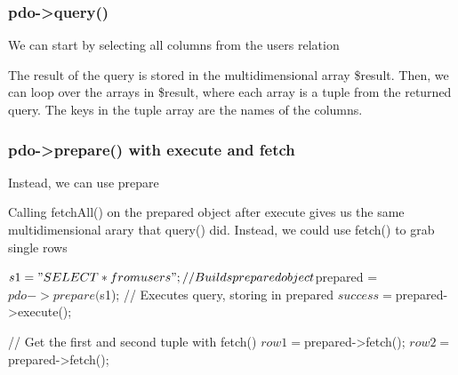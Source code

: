 \documentclass{report}
\begin{document}
    \bigbreak \noindent 
    \subsubsection{pdo->query()}
    \bigbreak \noindent 
    We can start by selecting all columns from the users relation
    \bigbreak \noindent 
    \bigbreak \noindent 
    The result of the query is stored in the multidimensional array \$result. Then, we can loop over the arrays in \$result, where each array is a tuple from the returned query. The keys in the tuple array are the names of the columns.

    \bigbreak \noindent 
    \subsubsection{pdo->prepare() with execute and fetch}
    \bigbreak \noindent 
    Instead, we can use prepare
    \bigbreak \noindent 
    \bigbreak \noindent 
    Calling fetchAll() on the prepared object after execute gives us the same multidimensional arary that query() did.
    \bigbreak \noindent 
    Instead, we could use fetch() to grab single rows
    \bigbreak \noindent 
    \begin{phpcode}
        $s1 = "SELECT * from users";
        // Builds prepared object
        $prepared = $pdo->prepare($s1);
        // Executes query, storing in prepared
        $success = $prepared->execute();

        // Get the first and second tuple with fetch()
        $row1 = $prepared->fetch();
        $row2 = $prepared->fetch();
    \end{phpcode}
\end{document}
